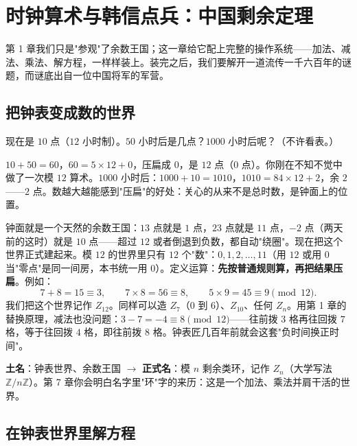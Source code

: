 \chapter{时钟算术与韩信点兵：中国剩余定理}

第 1 章我们只是"参观"了余数王国；这一章给它配上完整的操作系统——加法、减法、乘法、解方程，一样样装上。装完之后，我们要解开一道流传一千六百年的谜题，而谜底出自一位中国将军的军营。

\section{把钟表变成数的世界}

\begin{kaiwei}
现在是 $10$ 点（$12$ 小时制）。$50$ 小时后是几点？$1000$ 小时后呢？（不许看表。）
\end{kaiwei}

$10 + 50 = 60$，$60 = 5\times12 + 0$，压扁成 $0$，是 $12$ 点（$0$ 点）。你刚在不知不觉中做了一次模 $12$ 算术。$1000$ 小时后：$1000 + 10 = 1010$，$1010 = 84\times12 + 2$，余 $2$——$2$ 点。数越大越能感到"压扁"的好处：关心的从来不是总时数，是钟面上的位置。

钟面就是一个天然的余数王国：$13$ 点就是 $1$ 点，$23$ 点就是 $11$ 点，$-2$ 点（两天前的这时）就是 $10$ 点——超过 $12$ 或者倒退到负数，都自动"绕圈"。现在把这个世界正式建起来。模 $12$ 的世界里只有 $12$ 个"数"：$0, 1, 2, \dots, 11$（用 $12$ 或用 $0$ 当"零点"是同一间房，本书统一用 $0$）。定义运算：\textbf{先按普通规则算，再把结果压扁}。例如：
\[
7 + 8 = 15 \equiv 3, \qquad 7 \times 8 = 56 \equiv 8, \qquad 5 \times 9 = 45 \equiv 9 \pmod{12}.
\]
我们把这个世界记作 $Z_{12}$。同样可以造 $Z_7$（$0$ 到 $6$）、$Z_{10}$、任何 $Z_n$。用第 1 章的替换原理，减法也没问题：$3 - 7 = -4 \equiv 8 \pmod{12}$——往前拨 $3$ 格再往回拨 $7$ 格，等于往回拨 $4$ 格，即往前拨 $8$ 格。钟表匠几百年前就会这套"负时间换正时间"。

\begin{faming}
\textbf{土名}：钟表世界、余数王国 $\to$ \textbf{正式名}：模 $n$ 剩余类环，记作 $Z_n$（大学写法 $\mathbb{Z}/n\mathbb{Z}$）。第 7 章你会明白名字里"环"字的来历：这是一个加法、乘法并肩干活的世界。
\end{faming}

\section{在钟表世界里解方程}

